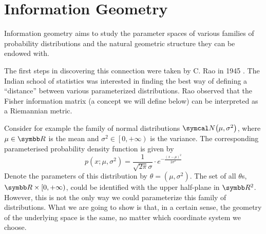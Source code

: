 






\section{Information Geometry}

Information geometry aims to study the parameter spaces of various families of probability distributions and the natural geometric structure they can be endowed with.

The first steps in discovering this connection were taken by C. Rao in 1945 \cite{Rao1945}. The Indian school of statistics was interested in finding the best way of defining a ``distance'' between various parameterized distributions. Rao observed that the Fisher information matrix (a concept we will define below) can be interpreted as a Riemannian metric. 

Consider for example the family of normal distributions \(\normal{\mu}{\sigma^2}\), where \(\mu \in \reals\) is the mean and \(\sigma^2 \in \left[0, +\infty\right)\) is the variance. The corresponding parameterised probability density function is given by
\[
    p \left(x; \mu, \sigma^2\right) = \frac{1}{\sqrt{2 \pi} \sigma} \cdot e^{- \frac{(x - \mu)^2}{2 \sigma^2}}
\]
Denote the parameters of this distribution by \(\theta = \left(\mu, \sigma^2\right)\). The set of all \(\theta\)s, \(\reals \times \left[0, +\infty\right)\), could be identified with the upper half-plane in \(\reals^2\). However, this is not the only way we could parameterize this family of distributions. What we are going to show is that, in a certain sense, the geometry of the underlying space is the same, no matter which coordinate system we choose.

